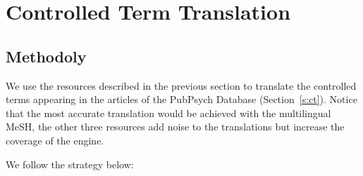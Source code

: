 \documentclass[a4paper,11pt]{article}
\begin{document}
\section{Controlled Term Translation}
\label{s:cttrad}

\subsection{Methodoly}
We use the resources described in the previous section to translate the controlled terms appearing in the articles of the PubPsych Database (Section~\ref{s:ct}).
Notice that the most accurate translation would be achieved with the multilingual MeSH, the other three resources add noise to the translations but increase the coverage of the engine.

\bigskip
\noindent
We follow the strategy below:
\end{document}
